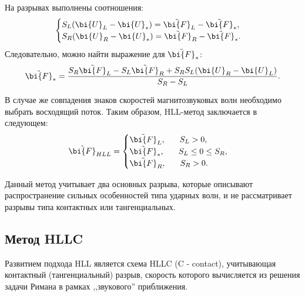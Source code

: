 \documentclass[12pt, a4paper]{article}
\begin{document}
 	На разрывах выполнены соотношения:
 	\[
 	\begin{cases}
 		S_L(\bi{U}_L - \bi{U}_*) = \tilde{\bi{F}}_L - \tilde{\bi{F}}_*,\\
 		S_R(\bi{U}_R - \bi{U}_*) = \tilde{\bi{F}}_R - \tilde{\bi{F}}_*.
 	\end{cases}
 	\]
 	Следовательно, можно найти выражение для $\tilde{\bi{F}}_*$:
 	\[
 		\tilde{\bi{F}}_* = \dfrac{S_R\tilde{\bi{F}}_L - S_L\tilde{\bi{F}}_R + S_RS_L(\bi{U}_R-\bi{U}_L)}{S_R-S_L}.
 	\]
 	
 	В случае же совпадения знаков скоростей магнитозвуковых волн необходимо выбрать восходящий поток. Таким образом, HLL-метод заключается в следующем:
 	\[
 	\tilde{\bi{F}}_{HLL} = 
 		\begin{cases}
 		\tilde{\bi{F}}_{L}, \phantom{xxx} S_L > 0, \\
 			\tilde{\bi{F}}_{*}, \phantom{xxx} S_L \le 0 \le S_R, \\
 			\tilde{\bi{F}}_{R}, \phantom{xxx} S_R > 0.
 		\end{cases}
 	\]
 	
 	Данный метод учитывает два основных разрыва, которые описывают распространение сильных особенностей типа ударных волн, и не рассматривает разрывы типа контактных или тангенциальных. 
 	\subsection{Метод HLLC}
 	
 	Развитием подхода HLL является схема HLLC (C - contact), учитывающая контактный (тангенциальный) разрыв, скорость которого вычисляется из решения задачи Римана в рамках ,,звукового'' приближения. 
 	
\end{document}
